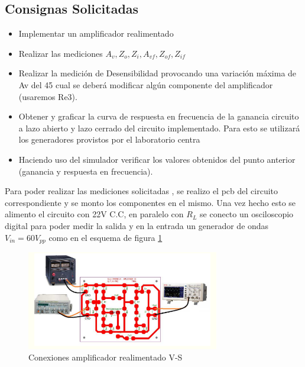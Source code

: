 \documentclass[12pt, letterpaper]{article}
\begin{document}
\subsection{Consignas Solicitadas}
\begin{itemize}
	\item  Implementar un amplificador realimentado
    \item  Realizar las mediciones $A_v, Z_o,Z_i, A_{vf},Z_{of},Z_{if} $
    \item  Realizar la medición de Desensibilidad provocando una variación máxima de Av del 45%
	cual se deberá modificar algún componente del amplificador (usaremos Re3).
    \item Obtener y graficar la curva de respuesta en frecuencia de la ganancia circuito a lazo abierto y lazo
	cerrado del circuito implementado. Para esto se utilizará los generadores provistos por el
	laboratorio centra
    \item Haciendo uso del simulador verificar los valores obtenidos del punto anterior (ganancia y
	respuesta en frecuencia).
\end{itemize}
Para poder realizar las mediciones solicitadas , se realizo el pcb del circuito correspondiente y se monto los componentes en el mismo.
Una vez hecho esto se alimento el circuito con 22V C.C, en paralelo con $R_L$ se conecto un osciloscopio digital para poder medir la salida y en la entrada un generador de ondas $V_{in}= 60 V_{pp}$ como en el esquema de figura \ref{fig:4.1}
\begin{figure}[h!]
	\centering
	\includegraphics[width=0.75\textwidth]{Imagenes/conexion.png}
	\caption{Conexiones amplificador realimentado V-S}
	\label{fig:4.1}
\end{figure}
\end{document}

